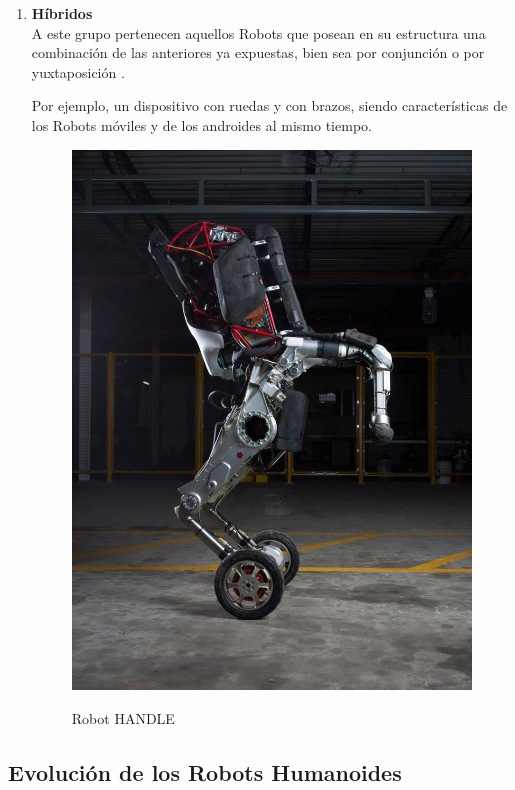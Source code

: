 \begin{enumerate}
\item \textbf{Híbridos}\\ A este grupo pertenecen aquellos Robots que posean en su estructura una combinación de las anteriores ya expuestas, bien sea por conjunción o por yuxtaposición \cite{ref6}. 

Por ejemplo, un dispositivo con ruedas y con brazos, siendo características de los Robots móviles y de los androides al mismo tiempo.

\begin{figure}[H]
\centering
{\includegraphics[scale=0.15]{imagenes/apartado_2/25_hibrido_handle_bd}}
\caption{Robot HANDLE}
\label{figura25}
\end{figure}

\end{enumerate}

\newpage

\subsection{Evolución de los Robots Humanoides}

